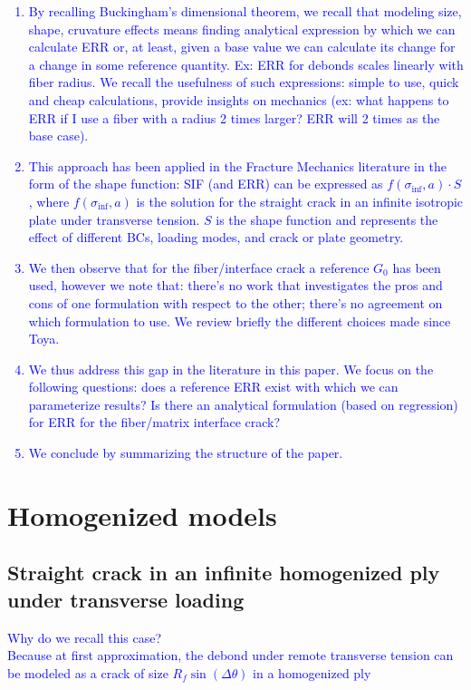 \documentclass[review]{elsarticle}
\begin{document}
\textcolor{blue}{
\begin{enumerate}
\item By recalling Buckingham's dimensional theorem, we recall that modeling size, shape, cruvature effects means finding analytical expression by which we can calculate ERR or, at least, given a base value we can calculate its change for a change in some reference quantity. Ex: ERR for debonds scales linearly with fiber radius. We recall the usefulness of such expressions: simple to use, quick and cheap calculations, provide insights on mechanics (ex: what happens to ERR if I use a fiber with a radius 2 times larger? ERR will 2 times as the base case).
\item This approach has been applied in the Fracture Mechanics literature in the form of the shape function: SIF (and ERR) can be expressed as $f(\sigma_{\inf},a)\cdot S$, where $f(\sigma_{\inf},a)$ is the solution for the straight crack in an infinite isotropic plate under transverse tension. $S$ is the shape function and represents the effect of different BCs, loading modes, and crack or plate geometry.
\item We then observe that for the fiber/interface crack a reference $G_{0}$ has been used, however we note that: there's no work that investigates the pros and cons of one formulation with respect to the other; there's no agreement on which formulation to use. We review briefly the different choices made since Toya.
\item We thus address this gap in the literature in this paper. We focus on the following questions: does a reference ERR exist with which we can parameterize results? Is there an analytical formulation (based on regression) for ERR for the fiber/matrix interface crack?
\item We conclude by summarizing the structure of the paper.
\end{enumerate}
}

\section{Homogenized models}

\subsection{Straight crack in an infinite homogenized ply under transverse loading}\label{subsec:straightcrack}

\textcolor{blue}{Why do we recall this case?\\Because at first approximation, the debond under remote transverse tension can be modeled as a crack of size $R_{f}\sin{\left(\Delta\theta\right)}$ in a homogenized ply}
\end{document}
